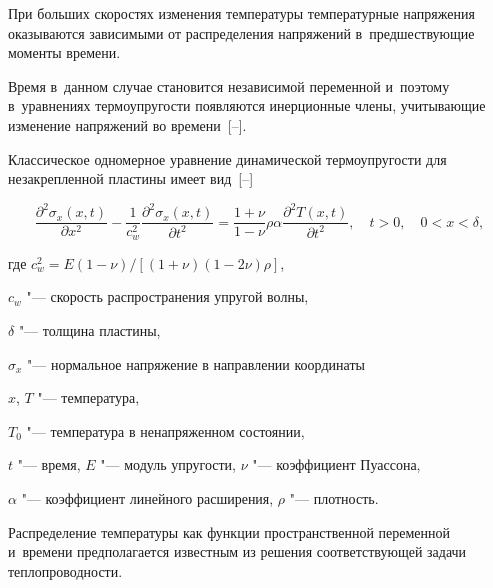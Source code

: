 











При больших скоростях изменения температуры температурные напряжения оказываются зависимыми от распределения напряжений в~предшествующие моменты времени. 

Время в~данном случае становится независимой переменной и~поэтому в~уравнениях термоупругости появляются инерционные члены, учитывающие изменение напряжений во времени~[--].



Классическое одномерное уравнение динамической термоупругости для незакрепленной пластины имеет вид~[--]

\begin{equation}

\label{kud:eq38}

\frac{\partial^2\sigma_x (x,t)}{\partial x^2}-\frac{1}{c_w^2}\frac{\partial^2\sigma _x (x,t)}{\partial t^2}=\frac{1+\nu }{1-\nu}\rho \alpha \frac{\partial ^2T(x,t)}{\partial t^2}, \quad

t>0, \quad 0<x< \delta,

\end{equation}

где $c_w^2=E(1- \nu)/[ (1+ \nu)(1-2 \nu )\rho ]$, 

$c_w$ "--- скорость распространения упругой волны, 

$\delta $ "--- толщина пластины, 

$\sigma _x$ "--- нормальное напряжение в направлении координаты

$x$, $T$ "--- температура, 

$T_0$ "--- температура в ненапряженном состоянии, 

$t$ "--- время, $E$ "--- модуль упругости, $\nu$ "--- коэффициент Пуассона, 

$\alpha$ "--- коэффициент линейного расширения, $\rho$ "--- плотность.%




Распределение температуры как функции пространственной переменной и~времени предполагается известным из решения соответствующей задачи теплопроводности.



